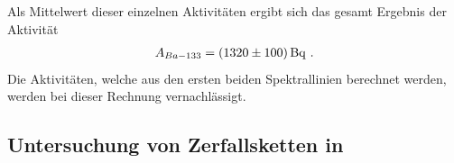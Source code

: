 Als Mittelwert dieser einzelnen Aktivitäten ergibt sich das gesamt Ergebnis der Aktivität 
\begin{align*}
A_{Ba-133}=\SI{1320+-100}{\becquerel} \text{ .}
\end{align*}
Die Aktivitäten, welche aus den ersten beiden Spektrallinien berechnet werden, werden bei dieser Rechnung vernachlässigt.
\subsection{Untersuchung von Zerfallsketten in }
\label{subsec:a4}



